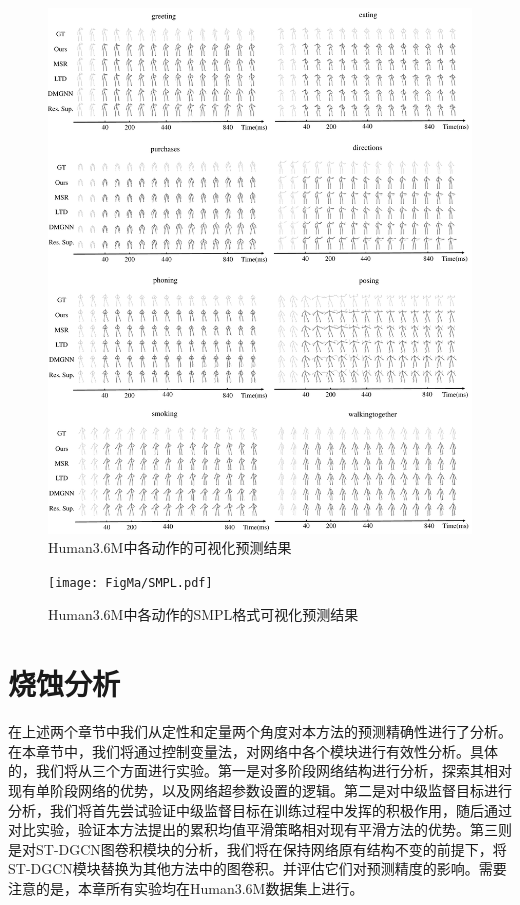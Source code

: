 \begin{figure}[ht]
    \centering
    \includegraphics[width=1\textwidth]{FigMa/more_result.pdf}
    \caption{Human3.6M中各动作的可视化预测结果}
    \label{fig:more_result}
\end{figure}

\begin{figure}[ht]
    \centering
    \texttt{[image: FigMa/SMPL.pdf]}
    \caption{Human3.6M中各动作的SMPL格式可视化预测结果}
    \label{fig:SMPL}
\end{figure}

\clearpage

\section{烧蚀分析}
在上述两个章节中我们从定性和定量两个角度对本方法的预测精确性进行了分析。在本章节中，我们将通过控制变量法，对网络中各个模块进行有效性分析。具体的，我们将从三个方面进行实验。第一是对多阶段网络结构进行分析，探索其相对现有单阶段网络的优势，以及网络超参数设置的逻辑。第二是对中级监督目标进行分析，我们将首先尝试验证中级监督目标在训练过程中发挥的积极作用，随后通过对比实验，验证本方法提出的累积均值平滑策略相对现有平滑方法的优势。第三则是对ST-DGCN图卷积模块的分析，我们将在保持网络原有结构不变的前提下，将ST-DGCN模块替换为其他方法中的图卷积。并评估它们对预测精度的影响。需要注意的是，本章所有实验均在Human3.6M数据集上进行。

